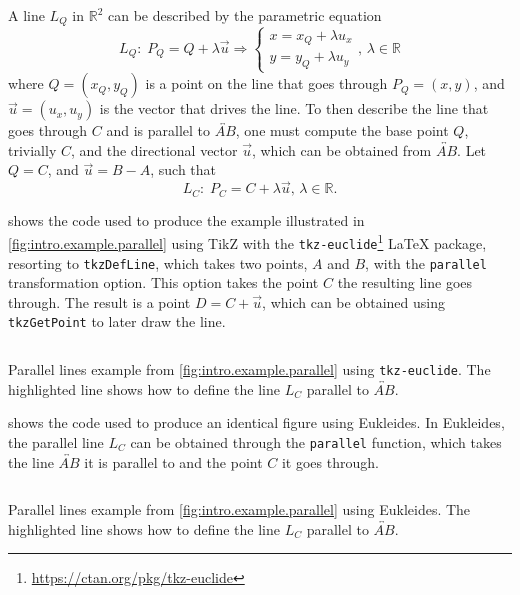 A line $L_Q$ in $\mathbb{R}^2$ can be described by the parametric equation
\begin{equation}\label{eq:line.parametric.2}
  L_Q\!:\; P_Q = Q + \lambda\vec{u} \Rightarrow
  \begin{cases}
    x = x_Q + \lambda u_x \\
    y = y_Q + \lambda u_y
  \end{cases},\,\lambda \in \mathbb{R}
\end{equation}
where $Q = (x_Q, y_Q)$ is a point on the line that goes through $P_Q = (x, y)$,
and $\vec{u} = (u_x, u_y)$ is the vector that drives the line.  To then describe
the line that goes through $C$ and is parallel to $\overleftrightarrow{AB}$, one
must compute the base point $Q$, trivially $C$, and the directional vector
$\vec{u}$, which can be obtained from $\overleftrightarrow{AB}$.  Let $Q = C$,
and $\vec{u} = B - A$, such that
\[ L_C\!:\; P_C = C + \lambda \vec{u},\,\lambda \in \mathbb{R}. \]

 shows the code used to produce the
example illustrated in \cref{fig:intro.example.parallel} using \ac{TikZ} with
the \texttt{tkz-euclide}\footnote{\url{https://ctan.org/pkg/tkz-euclide}}
\LaTeX{} package, resorting to \texttt{tkzDefLine}, which takes two points, $A$
and $B$, with the \texttt{parallel} transformation option.  This option takes
the point $C$ the resulting line goes through.  The result is a point $D = C +
\vec{u}$, which can be obtained using \texttt{tkzGetPoint} to later draw the
line. 

\begin{listing}[htb]
  \inputminted{latex}{tikz/ex-parallel.tikz}
  \caption[Parallel lines example using \texttt{tkz-euclide}]{
    Parallel lines example from \cref{fig:intro.example.parallel} using
    \texttt{tkz-euclide}.  The highlighted line shows how to define the line
    $L_C$ parallel to $\overleftrightarrow{AB}$.}%
  \label{lst:intro.example.parallel.tikz}
\end{listing}

 shows the code used to produce an
identical figure using Eukleides.  In Eukleides, the parallel line $L_C$ can be
obtained through the \texttt{parallel} function, which takes the line
$\overleftrightarrow{AB}$ it is parallel to and the point $C$ it goes through.

\begin{listing}[htb]
  \inputminted{text}{euk/ex-parallel.euk}
  \caption[Parallel lines example using Eukleides]{
    Parallel lines example from \cref{fig:intro.example.parallel} using
    Eukleides.  The highlighted line shows how to define the line $L_C$
    parallel to $\overleftrightarrow{AB}$.}%
  \label{lst:intro.example.parallel.euk}
\end{listing}

